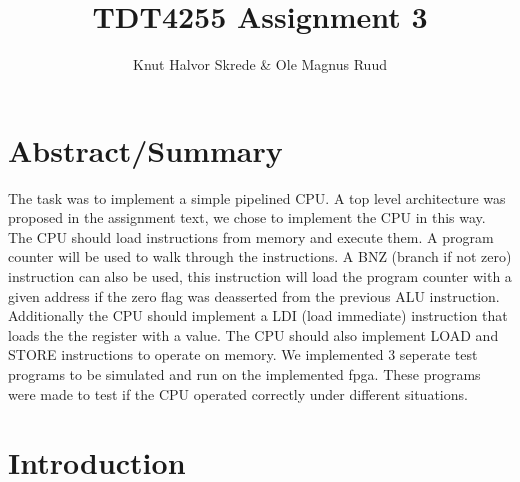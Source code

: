 \documentclass[11pt]{report}
\title{TDT4255 Assignment 3}
\author{Knut Halvor Skrede \& Ole Magnus Ruud}
\begin{document}
\maketitle
\clearpage


\section*{Abstract/Summary}
        

The task was to implement a simple pipelined CPU. A top level architecture 
was proposed in the assignment text, we chose to implement the CPU in this way. 
The CPU should load instructions from memory and execute them. 
A program counter will be used to walk through the 
instructions. A BNZ (branch if not zero) instruction can also be used, this 
instruction will load the program counter with a given address if the zero flag
was deasserted from the previous ALU instruction. Additionally the CPU should implement a 
LDI (load immediate) instruction that loads the the register with a value. 
The CPU should also implement LOAD and STORE instructions to operate on memory.
We implemented 3 seperate test programs to be simulated and run on the implemented
fpga. These programs were made to test if the CPU operated correctly under different
situations.

\section*{Introduction}

\end{document}
